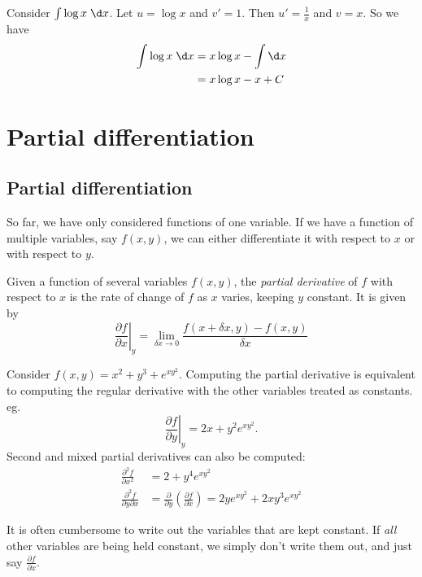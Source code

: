 \documentclass[a4paper]{article}
\begin{document}
\begin{eg}
  Consider $\int \log x\; \d x$. Let $u = \log x$ and $v' = 1$. Then $u' = \frac{1}{x}$ and $v = x$. So we have
  \begin{align*}
    \int \log x\; \d x &= x\log x - \int \d x\\
    &= x \log x - x + C
  \end{align*}
\end{eg}

\section{Partial differentiation}
\subsection{Partial differentiation}
So far, we have only considered functions of one variable. If we have a function of multiple variables, say $f(x, y)$, we can either differentiate it with respect to $x$ or with respect to $y$.
\begin{defi}
  Given a function of several variables $f(x, y)$, the \emph{partial derivative} of $f$ with respect to $x$ is the rate of change of $f$ as $x$ varies, keeping $y$ constant. It is given by
  \[
    \left. \frac{\partial f}{\partial x}\right|_y = \lim_{\delta x\to 0} \frac{f(x + \delta x, y) - f(x, y)}{\delta x}
  \]
\end{defi}

\begin{eg}
  Consider $f(x, y) = x^2 + y^3 + e^{xy^2}$. Computing the partial derivative is equivalent to computing the regular derivative with the other variables treated as constants. eg.
  \[
    \left.\frac{\partial f}{\partial y}\right|_y = 2x + y^2e^{xy^2}.
  \]
  Second and mixed partial derivatives can also be computed:
  \begin{align*}
    \frac{\partial^2f}{\partial x^2} &= 2 + y^4e^{xy^2}\\
    \frac{\partial^2 f}{\partial y\partial x} &= \frac{\partial}{\partial y}\left(\frac{\partial f}{\partial x}\right) = 2ye^{xy^2} + 2xy^{3}e^{xy^2}
  \end{align*}
\end{eg}
It is often cumbersome to write out the variables that are kept constant. If \emph{all} other variables are being held constant, we simply don't write them out, and just say $\frac{\partial f}{\partial x}$.
\end{document}
